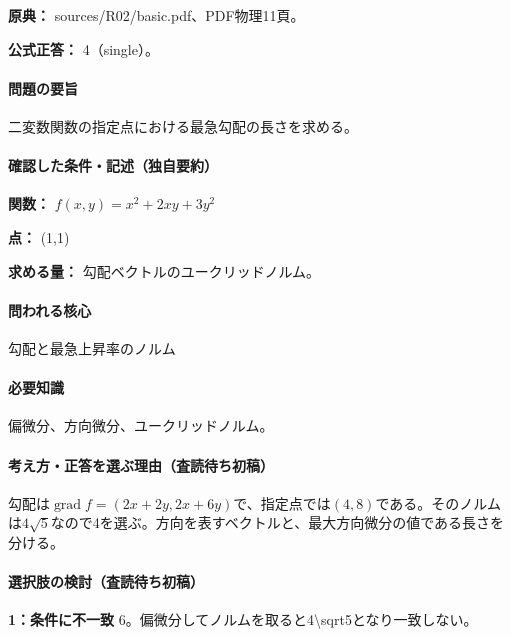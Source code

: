\noindent\textbf{原典：} sources/R02/basic.pdf、PDF物理11頁。

\textbf{公式正答：} 4（single）。

\paragraph{問題の要旨} 二変数関数の指定点における最急勾配の長さを求める。

\paragraph{確認した条件・記述（独自要約）}\mbox{}\par

\noindent\textbf{関数：} \(f(x,y)=x^2+2xy+3y^2\)\par

\noindent\textbf{点：} (1,1)\par

\noindent\textbf{求める量：} 勾配ベクトルのユークリッドノルム。\par

\paragraph{問われる核心} 勾配と最急上昇率のノルム

\paragraph{必要知識} 偏微分、方向微分、ユークリッドノルム。

\paragraph{考え方・正答を選ぶ理由（査読待ち初稿）} 勾配は\(\operatorname{grad}f=(2x+2y,2x+6y)\)で、指定点では\((4,8)\)である。そのノルムは\(4\sqrt5\)なので4を選ぶ。方向を表すベクトルと、最大方向微分の値である長さを分ける。

\paragraph{選択肢の検討（査読待ち初稿）}\mbox{}\par

\noindent\textbf{1：条件に不一致} \(6\)。偏微分してノルムを取ると4\textbackslash{}sqrt5となり一致しない。\par

